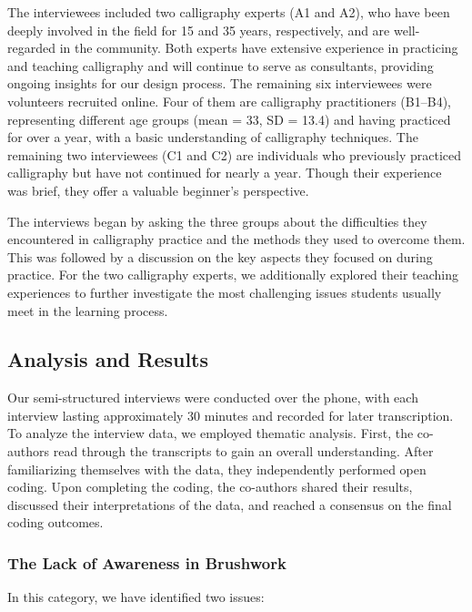 The interviewees included two calligraphy experts (A1 and A2), who have been deeply involved in the field for 15 and 35 years, respectively, and are well-regarded in the community. Both experts have extensive experience in practicing and teaching calligraphy and will continue to serve as consultants, providing ongoing insights for our design process. The remaining six interviewees were volunteers recruited online. Four of them are calligraphy practitioners (B1–B4), representing different age groups  (mean = 33, SD = 13.4) and having practiced for over a year, with a basic understanding of calligraphy techniques. The remaining two interviewees (C1 and C2) are individuals who previously practiced calligraphy but have not continued for nearly a year. Though their experience was brief, they offer a valuable beginner's perspective.

The interviews began by asking the three groups about the difficulties they encountered in calligraphy practice and the methods they used to overcome them. This was followed by a discussion on the key aspects they focused on during practice. For the two calligraphy experts, we additionally explored their teaching experiences to further investigate the most challenging issues students usually meet in the learning process. 
 
\subsection{Analysis and Results}
Our semi-structured interviews were conducted over the phone, with each interview lasting approximately 30 minutes and recorded for later transcription. To analyze the interview data, we employed thematic analysis. First, the co-authors read through the transcripts to gain an overall understanding. After familiarizing themselves with the data, they independently performed open coding. Upon completing the coding, the co-authors shared their results, discussed their interpretations of the data, and reached a consensus on the final coding outcomes. 

\subsubsection{The Lack of Awareness in Brushwork}

In this category, we have identified two issues:

